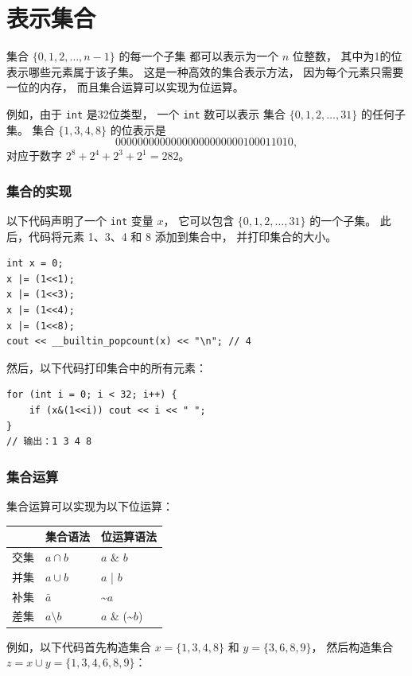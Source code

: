 \section{表示集合}

集合 $\{0,1,2,\ldots,n-1\}$ 的每一个子集
都可以表示为一个 $n$ 位整数，
其中为1的位表示哪些元素属于该子集。
这是一种高效的集合表示方法，
因为每个元素只需要一位的内存，
而且集合运算可以实现为位运算。

例如，由于 \texttt{int} 是32位类型，
一个 \texttt{int} 数可以表示
集合 $\{0,1,2,\ldots,31\}$ 的任何子集。
集合 $\{1,3,4,8\}$ 的位表示是
\[00000000000000000000000100011010,\]
对应于数字 $2^8+2^4+2^3+2^1=282$。

\subsubsection{集合的实现}

以下代码声明了一个 \texttt{int} 变量 $x$，
它可以包含 $\{0,1,2,\ldots,31\}$ 的一个子集。
此后，代码将元素 1、3、4 和 8 添加到集合中，
并打印集合的大小。
\begin{lstlisting}
int x = 0;
x |= (1<<1);
x |= (1<<3);
x |= (1<<4);
x |= (1<<8);
cout << __builtin_popcount(x) << "\n"; // 4
\end{lstlisting}
然后，以下代码打印集合中的所有元素：
\begin{lstlisting}
for (int i = 0; i < 32; i++) {
    if (x&(1<<i)) cout << i << " ";
}
// 输出：1 3 4 8
\end{lstlisting}

\subsubsection{集合运算}

集合运算可以实现为以下位运算：

\begin{center}
\begin{tabular}{lll}
& 集合语法 & 位运算语法 \\
\hline
交集 & $a \cap b$ & $a$ \& $b$ \\
并集 & $a \cup b$ & $a$ | $b$ \\
补集 & $\bar a$ & \textasciitilde$a$ \\
差集 & $a \setminus b$ & $a$ \& (\textasciitilde$b$) \\
\end{tabular}
\end{center}

例如，以下代码首先构造集合
$x=\{1,3,4,8\}$ 和 $y=\{3,6,8,9\}$，
然后构造集合 $z = x \cup y = \{1,3,4,6,8,9\}$：


